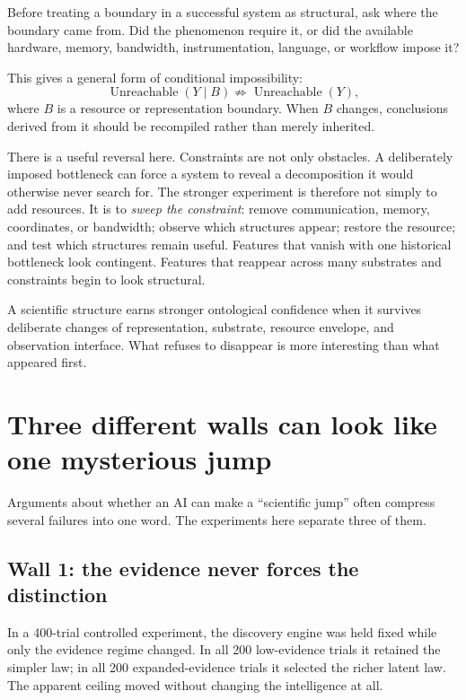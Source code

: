 \documentclass[11pt]{article}
\begin{document}
\begin{keybox}
Before treating a boundary in a successful system as structural, ask where the boundary came from. Did the phenomenon require it, or did the available hardware, memory, bandwidth, instrumentation, language, or workflow impose it?
\end{keybox}

This gives a general form of conditional impossibility:
\[
\boxed{\operatorname{Unreachable}(Y\mid B)\not\Rightarrow\operatorname{Unreachable}(Y),}
\]
where $B$ is a resource or representation boundary. When $B$ changes, conclusions derived from it should be recompiled rather than merely inherited.

There is a useful reversal here. Constraints are not only obstacles. A deliberately imposed bottleneck can force a system to reveal a decomposition it would otherwise never search for. The stronger experiment is therefore not simply to add resources. It is to \emph{sweep the constraint}: remove communication, memory, coordinates, or bandwidth; observe which structures appear; restore the resource; and test which structures remain useful. Features that vanish with one historical bottleneck look contingent. Features that reappear across many substrates and constraints begin to look structural.

\begin{resultbox}
A scientific structure earns stronger ontological confidence when it survives deliberate changes of representation, substrate, resource envelope, and observation interface. What refuses to disappear is more interesting than what appeared first.
\end{resultbox}

\section{Three different walls can look like one mysterious jump}
Arguments about whether an AI can make a ``scientific jump'' often compress several failures into one word. The experiments here separate three of them.

\subsection*{Wall 1: the evidence never forces the distinction}
In a 400-trial controlled experiment, the discovery engine was held fixed while only the evidence regime changed. In all 200 low-evidence trials it retained the simpler law; in all 200 expanded-evidence trials it selected the richer latent law. The apparent ceiling moved without changing the intelligence at all.
\end{document}
